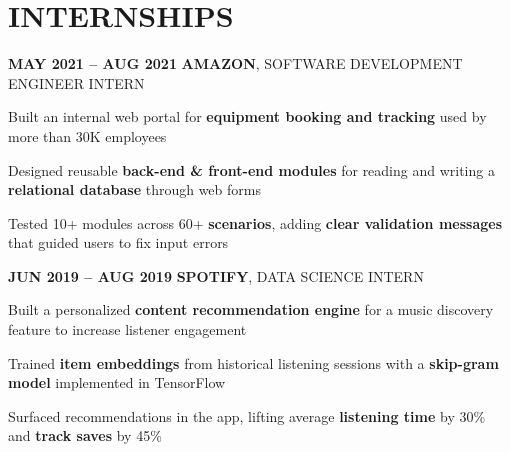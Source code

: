     \section{INTERNSHIPS}
    \begin{twocolentry}{
        \textbf{MAY 2021 -- AUG 2021}
        }
        \textbf{AMAZON}, SOFTWARE DEVELOPMENT ENGINEER INTERN
    \end{twocolentry}
    \begin{onecolentry}
        \vspace{0.05 cm}
        \begin{highlights}
            \item Built an internal web portal for \textbf{equipment booking and tracking} used by more than 30K employees
            \item Designed reusable \textbf{back-end \& front-end modules} for reading and writing a \textbf{relational database} through web forms
            \item Tested 10+ modules across 60+ \textbf{scenarios}, adding \textbf{clear validation messages} that guided users to fix input errors
        \end{highlights}
    \end{onecolentry}
    \vspace{0.2 cm}
    \begin{twocolentry}{
        \textbf{JUN 2019 -- AUG 2019}
        }
        \textbf{SPOTIFY}, DATA SCIENCE INTERN
    \end{twocolentry}
    \begin{onecolentry}
        \vspace{0.05 cm}
        \begin{highlights}
            \item Built a personalized \textbf{content recommendation engine} for a music discovery feature to increase listener engagement
            \item Trained \textbf{item embeddings} from historical listening sessions with a \textbf{skip-gram model} implemented in TensorFlow
            \item Surfaced recommendations in the app, lifting average \textbf{listening time} by 30\% and \textbf{track saves} by 45\%
        \end{highlights}
    \end{onecolentry}

